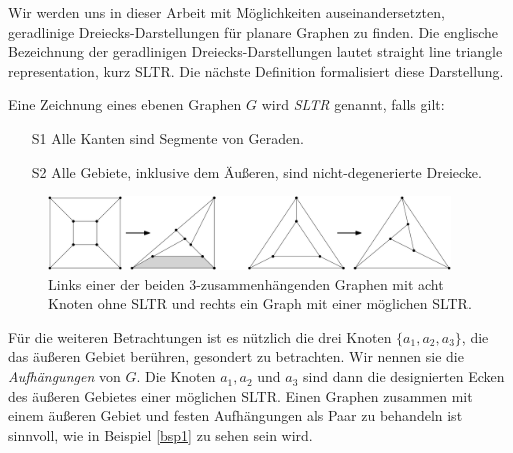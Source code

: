 Wir werden uns in dieser Arbeit mit Möglichkeiten auseinandersetzten, geradlinige Dreiecks-Darstellungen für planare Graphen zu finden. Die englische Bezeichnung der geradlinigen Dreiecks-Darstellungen lautet straight line triangle representation, kurz SLTR. Die nächste Definition formalisiert diese Darstellung.

\begin{definition}[SLTR]\label{defsltr}
Eine Zeichnung eines ebenen Graphen $G$ wird \textit{SLTR} genannt, falls gilt:
\begin{itemize}
\item[S1] Alle Kanten sind Segmente von Geraden.
\item[S2] Alle Gebiete, inklusive dem Äußeren, sind nicht-degenerierte Dreiecke.
\end{itemize}
\end{definition}

\begin{figure}[h]
	\centering
  \includegraphics[width=0.95\textwidth]{sltr-example.png}
	\caption{Links einer der beiden 3-zusammenhängenden Graphen mit acht Knoten ohne SLTR und rechts ein Graph mit einer möglichen SLTR.}
\end{figure}

Für die weiteren Betrachtungen ist es nützlich die drei Knoten $\{a_1,a_2,a_3\}$, die das äußeren Gebiet berühren, gesondert zu betrachten. Wir nennen sie die \textit{Aufhängungen} von $G$. Die Knoten $a_1,a_2$ und $a_3$ sind dann die designierten Ecken des äußeren Gebietes einer möglichen SLTR. Einen Graphen zusammen mit einem äußeren Gebiet und festen Aufhängungen als Paar zu behandeln ist sinnvoll, wie in Beispiel \ref{bsp1} zu sehen sein wird.

